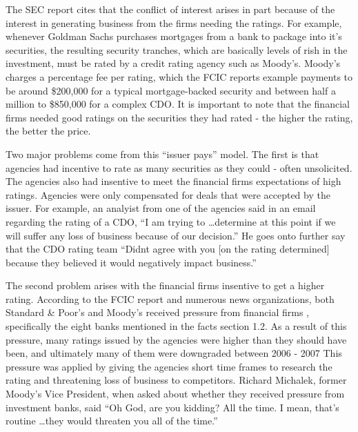 \documentclass[11pt]{article}
\begin{document}
\begin{multicols}{2}
The SEC report cites that the conflict of interest arises in part because of the interest in generating business from the firms needing the ratings.  For example, whenever Goldman Sachs purchases mortgages from a bank to package into it's securities, the resulting security tranches, which are basically levels of rish in the investment, must be rated by a credit rating agency such as Moody's.  Moody's charges a percentage fee per rating, which the FCIC reports example payments to be around \$200,000 for a typical mortgage-backed security and between half a million to \$850,000 for a complex CDO.\cite[p. 146]{govtReport} It is important to note that the financial firms needed good ratings on the securities they had rated - the higher the rating, the better the price.  

Two major problems come from this ``issuer pays'' model.  The first is that agencies had incentive to rate as many securities as they could - often unsolicited. \cite[p.60]{gatekeepers} The agencies also had insentive to meet the financial firms expectations of high ratings.  Agencies were only compensated for deals that were accepted by the issuer. \cite[p. 210]{govtReport} For example, an analyist from one of the agencies said in an email regarding the rating of a CDO, ``I am trying to \ldots determine at this point if we will suffer any loss of business because of our decision.'' He goes onto further say that the CDO rating team ``Didnt agree with you [on the rating determined] because they believed it would negatively impact business.'' \cite[p. 26]{SEA} 

The second problem arises with the financial firms insentive to get a higher rating.  According to the FCIC report and numerous news organizations, both Standard \& Poor's and Moody's received pressure from financial firms \cite[p. xxv]{govtReport}, specifically the eight banks mentioned in the facts section 1.2.  As a result of this pressure, many ratings issued by the agencies were higher than they should have been, and ultimately many of them were downgraded between 2006 - 2007 \cite{ratingEthics, huffCreditCause}  This pressure was applied by giving the agencies short time frames to research the rating and threatening loss of business to competitors.  Richard Michalek, former Moody's Vice President, when asked about whether they received pressure from investment banks, said ``Oh God, are you kidding? All the time. I mean, that's routine \ldots they would threaten you all of the time.'' \cite[p. 210]{govtReport}


\end{multicols}
\end{document}
